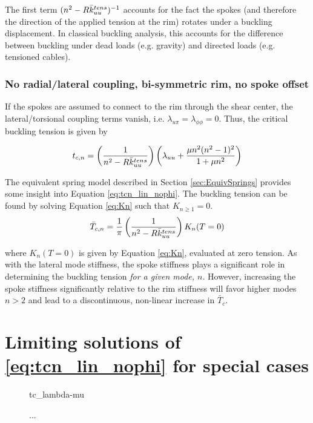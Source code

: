 \documentclass[\rootdir/thesis.tex]{subfiles}
\begin{document}
The first term $(n^2 - R\bar{k}_{uu}^{tens})^{-1}$ accounts for the fact the spokes (and therefore the direction of the applied tension at the rim) rotates under a buckling displacement. In classical buckling analysis, this accounts for the difference between buckling under dead loads (e.g. gravity) and directed loads (e.g. tensioned cables).

\subsubsection{No radial/lateral coupling, bi-symmetric rim, no spoke offset}
If the spokes are assumed to connect to the rim through the shear center, the lateral/torsional coupling terms vanish, i.e. $\lambda_{u\pi}=\lambda_{\phi\phi}=0$. Thus, the critical buckling tension is given by

\begin{equation}
\label{eq:tcn_lin_nophi}
t_{c,n} = \left(\frac{1}{n^2 - R\bar{k}_{uu}^{tens}}\right)
\left(\lambda_{uu}
      +\frac{\mu n^2(n^2-1)^2}
        {1 + \mu n^2}\right)
\end{equation}

The equivalent spring model described in Section \ref{sec:EquivSprings} provides some insight into Equation \eqref{eq:tcn_lin_nophi}. The buckling tension can be found by solving Equation \eqref{eq:Kn} such that $K_{n\geq 1} = 0$.
\begin{equation}
\bar{T}_{c,n} = \frac{1}{\pi}\left(\frac{1}{n^2 - R\bar{k}_{uu}^{tens}}\right) K_n(T=0)
\end{equation}

where $K_n(T=0)$ is given by Equation \eqref{eq:Kn}, evaluated at zero tension. As with the lateral mode stiffness, the spoke stiffness plays a significant role in determining the buckling tension \emph{for a given mode, $n$}. However, increasing the spoke stiffness significantly relative to the rim stiffness will favor higher modes $n > 2$ and lead to a discontinuous, non-linear increase in $\bar{T}_c$.

\section{Limiting solutions of \eqref{eq:tcn_lin_nophi} for special cases}

\begin{figure}
\centering
{tc_lambda-mu}
\caption{...}
\label{fig:tc_lambda_mu}
\end{figure}
\end{document}
